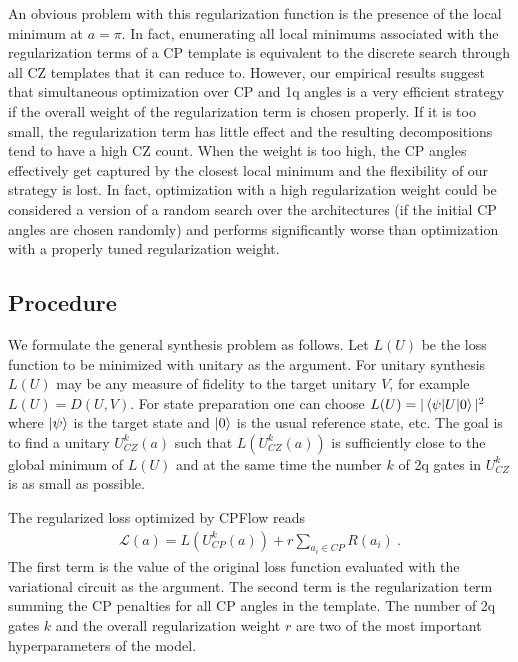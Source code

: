 \documentclass[twocolumn, amsfonts, amssymb, aps, nofootinbib]{revtex4-2}
\newcommand{\CZ}{\textsf{CZ }}
\newcommand{\CP}{\textsf{CP }}
\begin{document}
An obvious problem with this regularization function is the presence of the local minimum at $a=\pi$. In fact, enumerating all local minimums associated with the regularization terms of a \CP template is equivalent to the discrete search through all \CZ templates that it can reduce to. However, our empirical results suggest that simultaneous optimization over \CP and 1q angles is a very efficient strategy if the overall weight of the regularization term is chosen properly. If it is too small, the regularization term has little effect and the resulting decompositions tend to have a high \CZ count. When the weight is too high, the \CP angles effectively get captured by the closest local minimum and the flexibility of our strategy is lost. In fact, optimization with a high regularization weight could be considered a version of a random search over the architectures (if the initial \CP angles are chosen randomly) and performs significantly worse than optimization with a properly tuned regularization weight.

\subsection{Procedure}

We formulate the general synthesis problem as follows. Let $L(U)$ be the loss function to be minimized with unitary as the argument. For unitary synthesis $L(U)$ may be any measure of fidelity to the target unitary $V$, for example $L(U)=D(U, V)$. For state preparation one can choose $L(U) = |\braket{\psi|U|0}|^2$ where $\ket{\psi}$ is the target state and $\ket{0}$ is the usual reference state, etc. The goal is to find a unitary $U^k_{CZ}(a)$ such that $L(U^k_{CZ}(a))$ is sufficiently close to the global minimum of $L(U)$ and at the same time the number $k$ of 2q gates in $U^k_{CZ}$ is as small as possible.

The regularized loss optimized by CPFlow reads
\begin{align}
\mathcal{L}(a)=L(U^k_{CP}(a))+r\sum_{a_i\in CP} R(a_i) \ . \label{CP loss}
\end{align}
The first term is the value of the original loss function evaluated with the variational circuit as the argument. The second term is the regularization term summing the \CP penalties for all \CP angles in the template. The number of 2q gates $k$ and the overall regularization weight $r$ are two of the most important hyperparameters of the model.
\end{document}
